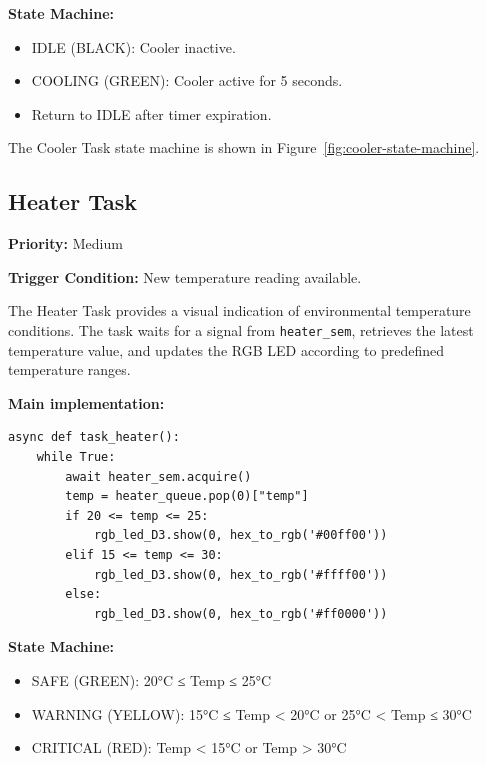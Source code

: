\textbf{State Machine:}

\begin{itemize}
  \item IDLE (BLACK): Cooler inactive.
  \item COOLING (GREEN): Cooler active for 5 seconds.
  \item Return to IDLE after timer expiration.
\end{itemize}

The Cooler Task state machine is shown in Figure~\ref{fig:cooler-state-machine}.


\subsection{Heater Task}

\textbf{Priority:} Medium

\textbf{Trigger Condition:} New temperature reading available.

The Heater Task provides a visual indication of environmental temperature conditions. The task waits for a signal from
\texttt{heater\_sem}, retrieves the latest temperature value, and updates the RGB LED according to predefined
temperature ranges.

\textbf{Main implementation:}

\begin{lstlisting}
async def task_heater():
    while True:
        await heater_sem.acquire()
        temp = heater_queue.pop(0)["temp"]
        if 20 <= temp <= 25:
            rgb_led_D3.show(0, hex_to_rgb('#00ff00'))
        elif 15 <= temp <= 30:
            rgb_led_D3.show(0, hex_to_rgb('#ffff00'))
        else:
            rgb_led_D3.show(0, hex_to_rgb('#ff0000'))
\end{lstlisting}

\textbf{State Machine:}

\begin{itemize}
  \item SAFE (GREEN): 20°C ≤ Temp ≤ 25°C
  \item WARNING (YELLOW): 15°C ≤ Temp \textless{} 20°C or 25°C \textless{} Temp ≤ 30°C
  \item CRITICAL (RED): Temp \textless{} 15°C or Temp \textgreater{} 30°C
\end{itemize}

